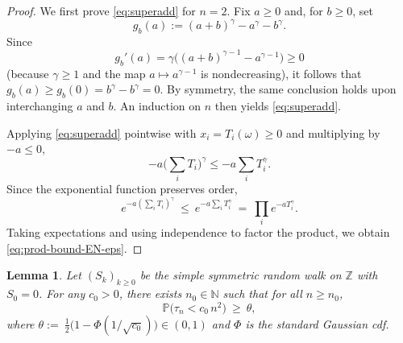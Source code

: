 \documentclass[preprint]{imsart}
\newcommand{\PP}{\mathbb{P}}
\newcommand{\1}{\mathbf{1}}
\theoremstyle{plain}
\newtheorem{lemma}[theorem]{Lemma}
\theoremstyle{definition}
\begin{document}
\begin{proof}We first prove \eqref{eq:superadd} for \(n=2\). Fix \(a\ge 0\) and, for \(b\ge 0\), set
\[
g_b(a):=(a+b)^\gamma-a^\gamma-b^\gamma .
\]
Since
\[
g_b'(a)=\gamma\big((a+b)^{\gamma-1}-a^{\gamma-1}\big)\ge 0
\]
(because \(\gamma\ge 1\) and the map \(a\mapsto a^{\gamma-1}\) is nondecreasing), it follows that \(g_b(a)\ge g_b(0)=b^\gamma-b^\gamma=0\). By symmetry, the same conclusion holds upon interchanging \(a\) and \(b\). An induction on \(n\) then yields \eqref{eq:superadd}.

Applying \eqref{eq:superadd} pointwise with \(x_i=T_i(\omega)\ge 0\) and multiplying by \(-a\le 0\),
\[
-a\Big(\sum_i T_i\Big)^\gamma \le -a\sum_i T_i^\gamma .
\]
Since the exponential function preserves order,
\[
e^{-a(\sum_i T_i)^\gamma}\ \le\ e^{-a\sum_i T_i^\gamma}\ =\ \prod_i e^{-a T_i^\gamma}.
\]
Taking expectations and using independence to factor the product, we obtain \eqref{eq:prod-bound-EN-eps}.

\end{proof}




\begin{lemma}\label{lem:inv-principle-EN-eps}
Let $(S_k)_{k\ge0}$ be the simple symmetric random walk on $\mathbb Z$ with $S_0=0$. For any $c_0>0$, there exists $n_0\in\mathbb N$ such that for all $n\ge n_0$,
\begin{equation}\label{eq:event-typical-EN-eps}
\PP\big(\tau_n< c_0\,n^2\big)\ \ge\ \theta,
\end{equation}
where \(\theta:=\ \tfrac12\big(1-\Phi(1/\sqrt{c_0})\big)\in(0,1)\) and $\Phi$ is the standard Gaussian cdf.
\end{lemma}
\end{document}
